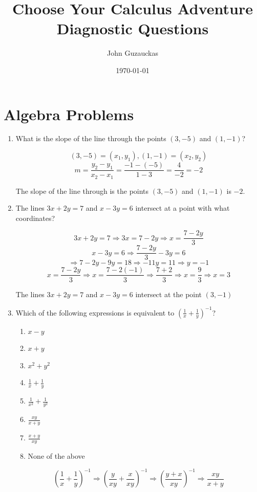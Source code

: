 \documentclass{article}
\title{Choose Your Calculus Adventure \\
        Diagnostic Questions}
\author{John Guzauckas}
\date{\today}
\begin{document}
\maketitle

\section{Algebra Problems}
\begin{enumerate}
\item What is the slope of the line through the points $(3, -5)$ and $(1, -1)$?

\[(3, -5) = (x_{1},y_{1}), (1, -1) = (x_{2}, y_{2})\]
\[m = \frac{y_{2}-y_{1}}{x_{2}-x_{1}} = \frac{-1 - (-5)}{1 - 3} = \frac{4}{-2} = -2\]

The slope of the line through is the points $(3, -5)$ and $(1, -1)$ is $-2$.

\item The lines $3x + 2y = 7$ and $x - 3y = 6$ intersect at a point with what coordinates?

\[3x + 2y = 7 \Longrightarrow 3x = 7 - 2y \Longrightarrow x = \frac{7 - 2y}{3}\]
\[x - 3y = 6 \Longrightarrow \frac{7 - 2y}{3} - 3y = 6 \]
\[\Longrightarrow 7 - 2y - 9y = 18 \Longrightarrow -11y = 11 \Longrightarrow y = -1\]
\[x = \frac{7 - 2y}{3} \Longrightarrow x = \frac{7 - 2(-1)}{3} \Longrightarrow \frac{7 + 2}{3}
\Longrightarrow x = \frac{9}{3} \Longrightarrow x = 3\]

The lines $3x + 2y = 7$ and $x - 3y = 6$ intersect at the point $(3, -1)$

\pagebreak
\item Which of the following expressions is equivalent to ${\left(\frac{1}{x} + \frac{1}{y}\right)}^{-1}$?
    \begin{enumerate}
    \item $x - y$
    \item $x + y$
    \item $x^{2} + y^{2}$
    \item $\frac{1}{x} + \frac{1}{y}$
    \item $\frac{1}{x^{2}} + \frac{1}{y^{2}}$
    \item $\frac{xy}{x + y}$
    \item $\frac{x + y}{xy}$
    \item None of the above
    \end{enumerate}
\[{\left(\frac{1}{x} + \frac{1}{y}\right)}^{-1} \Longrightarrow 
    {\left(\frac{y}{xy} + \frac{x}{xy}\right)}^{-1} \Longrightarrow
    {\left(\frac{y + x}{xy}\right)}^{-1} \Longrightarrow
    \frac{xy}{x + y}\] 


\end{enumerate}
\end{document}
